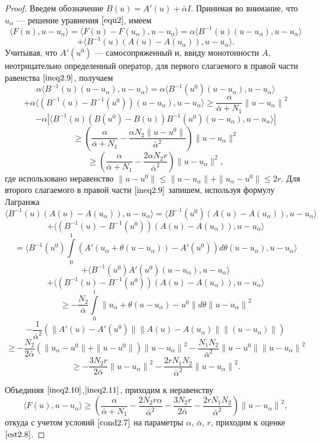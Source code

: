 \begin{proof} Введем обозначение $B(u)=A'(u)+\bar\alpha I$. Принимая во внимание, что $u_\alpha$ --- решение уравнения $\eqref{equ2}$, имеем
$$
\langle F(u), u-u_\alpha\rangle=\langle F(u)-F(u_\alpha), u-u_\alpha\rangle=\alpha\langle B^{-1}(u)(u-u_\alpha), u-u_\alpha\rangle$$ \begin{equation}\label{ineq2.9}+\langle B^{-1}(u)(A(u)-A(u_\alpha)), u-u_\alpha\rangle.
\end{equation}
Учитывая, что $A'(u^0)$ --- самосопряженный и, ввиду монотонности $A$, неотрицательно определенный оператор, для первого слагаемого в правой части равенства $\eqref{ineq2.9}$, получаем
$$\alpha\langle B^{-1}(u)(u-u_\alpha), u-u_\alpha\rangle=\alpha\langle B^{-1}(u^0)(u-u_\alpha), u-u_\alpha\rangle$$ $$+\alpha\langle (B^{-1}(u)-B^{-1}(u^0))(u-u_\alpha), u-u_\alpha\rangle \ge \frac{\alpha}{\bar\alpha+N_1}{\|u-u_\alpha\|}^2$$
$$ - \alpha|\langle B^{-1}(u)(B(u^0)-B(u))B^{-1}(u^0)(u-u_\alpha), u-u_\alpha\rangle| $$
$$\ge \left( \frac{\alpha}{\bar\alpha+N_1}-\frac{\alpha N_2\|u-u^0\|}{{\bar\alpha}^2}\right)\|u-u_\alpha\|^2$$
\begin{equation}\label{ineq2.10}
\ge\left(\frac{\alpha}{\bar\alpha+N_1}-\frac{2\alpha N_2r}{{\bar\alpha}^2}\right)\|u-u_\alpha\|^2,
\end{equation} где использовано неравенство $\|u-u^0\|\le\|u-u_\alpha\|+\|u_\alpha-u^0\|\le 2r$.
Для второго слагаемого в правой части $\eqref{ineq2.9}$ запишем, используя формулу Лагранжа \cite{Tre1993}
$$ \langle B^{-1}(u)(A(u)-A(u_\alpha)), u-u_\alpha\rangle= \langle B^{-1}(u^0)(A(u)-A(u_\alpha)), u-u_\alpha\rangle$$
$$+\langle (B^{-1}(u)-B^{-1}(u^0))(A(u)-A(u_\alpha)), u-u_\alpha\rangle$$
$$=\langle B^{-1}(u^0)\int\limits_0^1 (A'(u_\alpha+\theta(u-u_\alpha))-A'(u^0))d\theta (u-u_\alpha), u-u_\alpha\rangle$$
$$+ \langle B^{-1}(u^0)A'(u^0)(u-u_\alpha), u-u_\alpha\rangle $$
$$+\langle (B^{-1}(u)-B^{-1}(u^0))(A(u)-A(u_\alpha)), u-u_\alpha\rangle$$
$$\ge-\frac{N_2}{\bar\alpha}\int\limits_0^1\|u_\alpha+\theta(u-u_\alpha)-u^0\|d\theta {\|u-u_\alpha\|}^2 $$
$$-\frac{1}{{\bar\alpha}^2}\left ( \|A'(u)-A'(u^0)\|\|A(u)-A(u_\alpha)\|\|(u-u_\alpha)\|\right ) $$$$ \ge - \frac{N_2}{2\bar\alpha} \left ( \|u_\alpha-u^0\|+\|u-u^0\|\right ){\|u-u_\alpha\|}^2 - \frac{N_1 N_2}{{\bar\alpha}^2}\|u-u^0\| {\|u-u_\alpha\|}^2 $$
\begin{equation}\label{ineq2.11}
\ge -\frac{3N_2r}{2\bar\alpha}{\|u-u_\alpha\|}^2-\frac{2rN_1 N_2}{{\bar\alpha}^2}{\|u-u_\alpha\|}^2.\end{equation}

Объединяя $\eqref{ineq2.10}$,$\eqref{ineq2.11}$, приходим к неравенству $$
\langle F(u), u-u_\alpha\rangle\ge\left (\frac{\alpha}{\bar\alpha+N_1}-\frac{2N_2 r \alpha}{{\bar\alpha}^2}-\frac{3N_2r}{2\bar\alpha}-\frac{2rN_1 N_2}{{\bar\alpha}^2}\right ){\|u-u_\alpha\|}^2, $$ откуда с учетом условий $\eqref{cond2.7}$ на параметры $\alpha$, $\bar\alpha$, $r$, приходим к оценке $\eqref{est2.8}$.
\end{proof}
